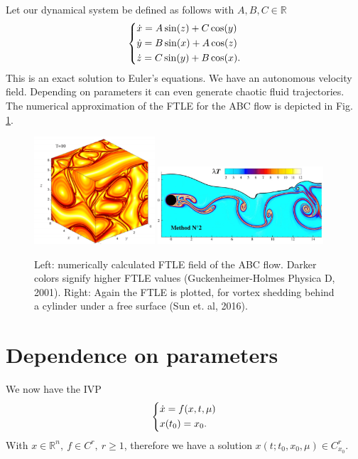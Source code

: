 \begin{ex}
	Let our dynamical system be defined as follows with $A,B,C \in \mathbb{R}$
\begin{align}
	\begin{dcases}
		\dot{x} = A \sin(z) + C \cos(y) \\
		\dot{y} = B \sin(x) + A \cos(z) \\
		\dot{z} = C \sin(y) + B \cos(x).
	\end{dcases}
\end{align}
This is an exact solution to Euler's equations.  We have an autonomous velocity field. Depending on parameters it can even generate chaotic fluid trajectories. The numerical approximation of the FTLE for the ABC flow is depicted in Fig. \ref{fig:FTLE_flows}.
\begin{figure}[h!]
	\centering
	\includegraphics[width=0.4\textwidth]{figures/ch1/14fluid1.png}
	\hspace{0.03\textwidth}
	\includegraphics[width=0.55\textwidth]{figures/ch1/15vortex_shedding.png}
	\caption{Left: numerically calculated FTLE field of the ABC flow. Darker colors signify higher FTLE values (Guckenheimer-Holmes Physica D, 2001). Right: Again the FTLE is plotted, for vortex shedding behind a cylinder under a free surface (Sun et. al, 2016).}
	\label{fig:FTLE_flows}
\end{figure}
\end{ex}
\vfill
\section{Dependence on parameters}
We now have the IVP
\begin{align}
	\begin{dcases}
		\dot{ {x}} = f( {x},t, {\mu} ) \\  {x}(t_0) =  {x}_0.
	\end{dcases}
\end{align}
With $ {x} \in \mathbb{R}^{n},\ f\in C^r,\ r\geq 1$, therefore we have a solution $ {x}(t; t_0,  {x}_0,  {\mu} ) \in C^r_{ {x}_0}$.

